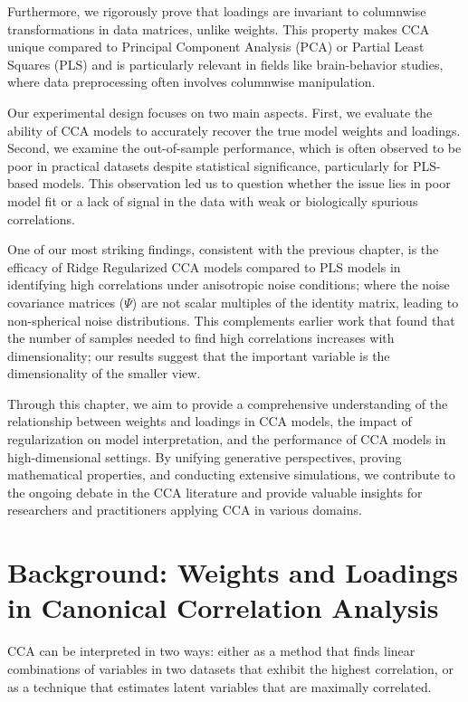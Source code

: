 Furthermore, we rigorously prove that loadings are invariant to columnwise transformations in data matrices, unlike weights. This property makes CCA unique compared to Principal Component Analysis (PCA) or Partial Least Squares (PLS) and is particularly relevant in fields like brain-behavior studies, where data preprocessing often involves columnwise manipulation.

Our experimental design focuses on two main aspects. First, we evaluate the ability of CCA models to accurately recover the true model weights and loadings. Second, we examine the out-of-sample performance, which is often observed to be poor in practical datasets despite statistical significance, particularly for PLS-based models. This observation led us to question whether the issue lies in poor model fit or a lack of signal in the data with weak or biologically spurious correlations.

One of our most striking findings, consistent with the previous chapter, is the efficacy of Ridge Regularized CCA models compared to PLS models in identifying high correlations under anisotropic noise conditions; where the noise covariance matrices ($\Psi$) are not scalar multiples of the identity matrix, leading to non-spherical noise distributions. This complements earlier work \citep{helmer2020stability} that found that the number of samples needed to find high correlations increases with dimensionality; our results suggest that the important variable is the dimensionality of the smaller view.

Through this chapter, we aim to provide a comprehensive understanding of the relationship between weights and loadings in CCA models, the impact of regularization on model interpretation, and the performance of CCA models in high-dimensional settings. By unifying generative perspectives, proving mathematical properties, and conducting extensive simulations, we contribute to the ongoing debate in the CCA literature and provide valuable insights for researchers and practitioners applying CCA in various domains.

\section{Background: Weights and Loadings in Canonical Correlation Analysis}

CCA can be interpreted in two ways: either as a method that finds linear combinations of variables in two datasets that exhibit the highest correlation, or as a technique that estimates latent variables that are maximally correlated.

